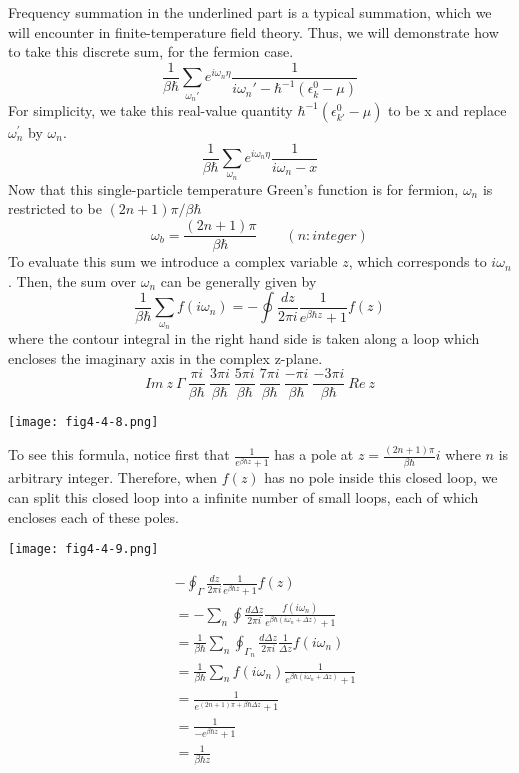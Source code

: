 Frequency summation in the underlined part is a typical summation, which we will encounter in finite-temperature field theory.
Thus, we will demonstrate how to take this discrete sum, for the fermion case.
\begin{equation}
\frac{1}{\beta\hbar} \sum_{\omega_n'} e^{i\omega_n\eta} \frac{1}{i\omega_n'-\hbar^{-1}(\epsilon_k^0-\mu)}
\end{equation}
For simplicity, we take this real-value quantity $\hbar^{-1}(\epsilon^{0}_{k'}-\mu)$ to be x and replace $\omega^{\prime}_n$ by $\omega_n$.
\[
\frac{1}{\beta\hbar}\sum_{\omega_n}e^{i\omega_n\eta} \frac{1}{i\omega_n-x} \tag{$4.4.21^\prime$}
\]
Now that this single-particle temperature Green's function is for fermion, $\omega_n$ is restricted to be $(2n+1)\pi/\beta\hbar$
\[
\omega_b=\frac{(2n+1)\pi}{\beta\hbar}\qquad(n:integer)
\]
To evaluate this sum we introduce a complex variable $z$, which corresponds to $i\omega_n$. Then, the sum over $\omega_n$ can be generally given by
\begin{equation}
\frac{1}{\beta\hbar}\sum_{\omega_n}f(i\omega_n)=-\oint\frac{dz}{2\pi i}\frac{1}{e^{\beta\hbar z}+1}f(z)
\end{equation}
where the contour integral in the right hand side is taken along a loop which encloses the imaginary axis in the complex z-plane.
\[
Im\ z\ \Gamma\ \frac{\pi i}{\beta\hbar}\ \frac{3\pi i}{\beta\hbar}\ \frac{5\pi i}{\beta\hbar}\ \frac{7\pi i}{\beta\hbar}\ \frac{-\pi i}{\beta\hbar}\ \frac{-3\pi i}{\beta\hbar}\ Re\ z
\]
\begin{center}
\texttt{[image: fig4-4-8.png]}
\end{center}
To see this formula, notice first that $\frac{1}{e^{\beta\hbar z}+1}$ has a pole at $z=\frac{(2n+1)\pi}{\beta\hbar}i$ where $n$ is arbitrary integer.
Therefore, when $f(z)$ has no pole inside this closed loop, we can split this closed loop into a infinite number of small loops, each of which encloses each of these poles.
\begin{center}
\texttt{[image: fig4-4-9.png]}
\end{center}
\[
\begin{aligned}
&-\oint_\Gamma \frac{dz}{2\pi i} \frac{1}{e^{\beta\hbar z}+1}f(z)\\
&=-\sum_n \oint \frac{d\Delta z}{2\pi i} \frac{f(i\omega_n)}{e^{\beta\hbar(i\omega_n+\Delta z)}+1}\\
&=\frac{1}{\beta\hbar} \sum_n \oint_{\Gamma_n} \frac{d\Delta z}{2\pi i} \frac{1}{\Delta z} f(i\omega_n)\\
&=\frac{1}{\beta\hbar}\sum_n f(i\omega_n) \frac{1}{e^{\beta\hbar(i\omega_n+\Delta z)}+1}\\
&=\frac{1}{e^{(2n+1)\pi+\beta\hbar\Delta z}+1}\\
&=\frac{1}{-e^{\beta\hbar z}+1}\\
&=\frac{1}{\beta\hbar z}
\end{aligned}
\]
